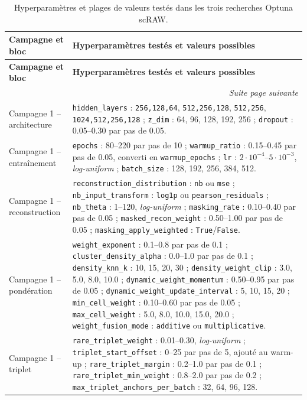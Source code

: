 {\scriptsize
\setlength{\tabcolsep}{3pt}
\renewcommand{\arraystretch}{1.12}
\begin{longtable}{p{}p{}}
\caption{Hyperparamètres et plages de valeurs testés dans les trois recherches Optuna scRAW.}
\label{tab:scraw_optuna_search_spaces}\\
\toprule
\textbf{Campagne et bloc} & \textbf{Hyperparamètres testés et valeurs possibles} \\
\midrule
\endfirsthead
\toprule
\textbf{Campagne et bloc} & \textbf{Hyperparamètres testés et valeurs possibles} \\
\midrule
\endhead
\midrule
\multicolumn{2}{r}{\textit{Suite page suivante}}\\
\endfoot
\bottomrule
\endlastfoot

Campagne 1 -- architecture & \texttt{hidden\_layers} : \texttt{256,128,64}, \texttt{512,256,128}, \texttt{512,256}, \texttt{1024,512,256,128} ; \texttt{z\_dim} : 64, 96, 128, 192, 256 ; \texttt{dropout} : 0.05--0.30 par pas de 0.05. \\
Campagne 1 -- entraînement & \texttt{epochs} : 80--220 par pas de 10 ; \texttt{warmup\_ratio} : 0.15--0.45 par pas de 0.05, converti en \texttt{warmup\_epochs} ; \texttt{lr} : \(2\cdot10^{-4}\)--\(5\cdot10^{-3}\), \textit{log-uniform} ; \texttt{batch\_size} : 128, 192, 256, 384, 512. \\
Campagne 1 -- reconstruction & \texttt{reconstruction\_distribution} : \texttt{nb} ou \texttt{mse} ; \texttt{nb\_input\_transform} : \texttt{log1p} ou \texttt{pearson\_residuals} ; \texttt{nb\_theta} : 1--120, \textit{log-uniform} ; \texttt{masking\_rate} : 0.10--0.40 par pas de 0.05 ; \texttt{masked\_recon\_weight} : 0.50--1.00 par pas de 0.05 ; \texttt{masking\_apply\_weighted} : \texttt{True}/\texttt{False}. \\
Campagne 1 -- pondération & \texttt{weight\_exponent} : 0.1--0.8 par pas de 0.1 ; \texttt{cluster\_density\_alpha} : 0.0--1.0 par pas de 0.1 ; \texttt{density\_knn\_k} : 10, 15, 20, 30 ; \texttt{density\_weight\_clip} : 3.0, 5.0, 8.0, 10.0 ; \texttt{dynamic\_weight\_momentum} : 0.50--0.95 par pas de 0.05 ; \texttt{dynamic\_weight\_update\_interval} : 5, 10, 15, 20 ; \texttt{min\_cell\_weight} : 0.10--0.60 par pas de 0.05 ; \texttt{max\_cell\_weight} : 5.0, 8.0, 10.0, 15.0, 20.0 ; \texttt{weight\_fusion\_mode} : \texttt{additive} ou \texttt{multiplicative}. \\
Campagne 1 -- triplet & \texttt{rare\_triplet\_weight} : 0.01--0.30, \textit{log-uniform} ; \texttt{triplet\_start\_offset} : 0--25 par pas de 5, ajouté au warm-up ; \texttt{rare\_triplet\_margin} : 0.2--1.0 par pas de 0.1 ; \texttt{rare\_triplet\_min\_weight} : 0.8--2.0 par pas de 0.2 ; \texttt{max\_triplet\_anchors\_per\_batch} : 32, 64, 96, 128. \\

\end{longtable}}
